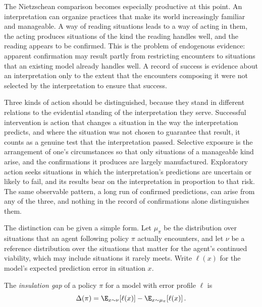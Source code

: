 The Nietzschean comparison becomes especially productive at this point. An interpretation can organize practices that make its world increasingly familiar and manageable. A way of reading situations leads to a way of acting in them, the acting produces situations of the kind the reading handles well, and the reading appears to be confirmed. This is the problem of endogenous evidence: apparent confirmation may result partly from restricting encounters to situations that an existing model already handles well. A record of success is evidence about an interpretation only to the extent that the encounters composing it were not selected by the interpretation to ensure that success.

Three kinds of action should be distinguished, because they stand in different relations to the evidential standing of the interpretation they serve. Successful intervention is action that changes a situation in the way the interpretation predicts, and where the situation was not chosen to guarantee that result, it counts as a genuine test that the interpretation passed. Selective exposure is the arrangement of one's circumstances so that only situations of a manageable kind arise, and the confirmations it produces are largely manufactured. Exploratory action seeks situations in which the interpretation's predictions are uncertain or likely to fail, and its results bear on the interpretation in proportion to that risk. The same observable pattern, a long run of confirmed predictions, can arise from any of the three, and nothing in the record of confirmations alone distinguishes them.

The distinction can be given a simple form. Let $\mu_\pi$ be the distribution over situations that an agent following policy $\pi$ actually encounters, and let $\nu$ be a reference distribution over the situations that matter for the agent's continued viability, which may include situations it rarely meets. Write $\ell(x)$ for the model's expected prediction error in situation $x$.

\begin{definition}
The \emph{insulation gap} of a policy $\pi$ for a model with error profile $\ell$ is
\[
\Delta(\pi)=\E_{x\sim\nu}\!\left[\ell(x)\right]-\E_{x\sim\mu_\pi}\!\left[\ell(x)\right].
\]
\end{definition}

